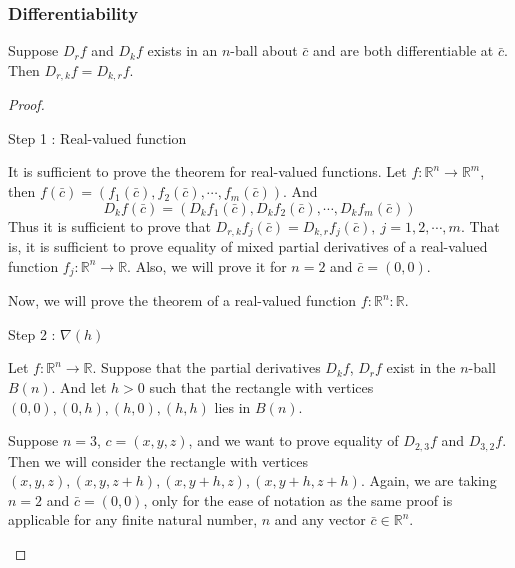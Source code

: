 \subsubsection{Differentiability}
\begin{theorem}
Suppose $D_r f$ and $D_k f$ exists in an $n$-ball about $\bar{c}$ and are both differentiable at $\bar{c}$.
Then $D_{r,k} f = D_{k,r} f$.
\end{theorem}
\begin{proof}
\begin{commentary}Step 1 : Real-valued function\end{commentary}

It is sufficient to prove the theorem for real-valued functions.
Let $f : \mathbb{R}^n \to \mathbb{R}^m$, then $f(\bar{c}) = \left( f_1(\bar{c}),f_2(\bar{c}),\cdots,f_m(\bar{c}) \right)$.
And $$D_k f(\bar{c}) = \left( D_k f_1(\bar{c}), D_k f_2(\bar{c}), \cdots, D_k f_m(\bar{c}) \right)$$
Thus it is sufficient to prove that $D_{r,k}f_j(\bar{c}) = D_{k,r}f_j(\bar{c}),\ j = 1,2,\cdots,m$.
That is, it is sufficient to prove equality of mixed partial derivatives of a real-valued function $f_j : \mathbb{R}^n \to \mathbb{R}$.
Also, we will prove it for $n = 2$ and $\bar{c} = (0,0)$.
\begin{commentary}
	Now, we will prove the theorem of a real-valued function $f : \mathbb{R}^n : \mathbb{R}$.\\
\end{commentary}
\begin{commentary}Step 2 : $\nabla(h)$\end{commentary}

Let $f : \mathbb{R}^n \to \mathbb{R}$.
Suppose that the partial derivatives $D_k f$, $D_r f$ exist in the $n$-ball $B(n)$.
And let $h > 0$ such that the rectangle with vertices $(0,0), (0,h), (h,0), (h,h)$ lies in $B(n)$.

\begin{commentary} Suppose $n=3$, $c = (x,y,z)$, and we want to prove equality of $D_{2,3} f$ and $D_{3,2} f$.
Then we will consider the rectangle with vertices $(x,y,z), (x,y,z+h), (x,y+h,z), (x,y+h,z+h)$.
Again, we are taking $n=2$ and $\bar{c} = (0,0)$, only for the ease of notation as the same proof is applicable for any finite natural number, $n$ and any vector $\bar{c} \in \mathbb{R}^n$.\end{commentary}


\end{proof}

